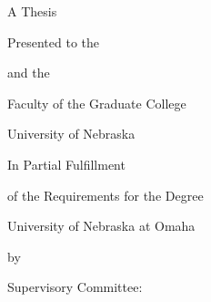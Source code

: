 \documentclass[12pt,oneside]{report}
\begin{document}
\hypersetup{pageanchor=false}
\begin{titlepage}
    \centering
    \singlespacing
    \vspace*{0.3in}
    \MakeUppercase{\ThesisTitle}\par\vspace{0.4in}
    A Thesis\par\vspace{0.12in}
    Presented to the\par\vspace{0.12in}
    \DepartmentName\par\vspace{0.12in}
    and the\par\vspace{0.12in}
    Faculty of the Graduate College\par\vspace{0.12in}
    University of Nebraska\par\vspace{0.4in}
    In Partial Fulfillment\par
    of the Requirements for the Degree\par\vspace{0.4in}
    \DegreeName\par\vspace{0.4in}
    University of Nebraska at Omaha\par\vspace{0.4in}
    by\par\vspace{0.2in}
    \AuthorName\par\vspace{0.4in}
    \MonthYear\par\vspace{0.5in}
    Supervisory Committee:\par\vspace{0.15in}
    \AdvisorName\par\vspace{0.1in}
    \CommitteeMemberOne\par\vspace{0.1in}
    \CommitteeMemberTwo\par\vspace{0.1in}
    \CommitteeMemberThree\par\vspace{0.1in}
\end{titlepage}
\hypersetup{pageanchor=true}

\setcounter{tocdepth}{2}
\setcounter{secnumdepth}{-1}
\end{document}
